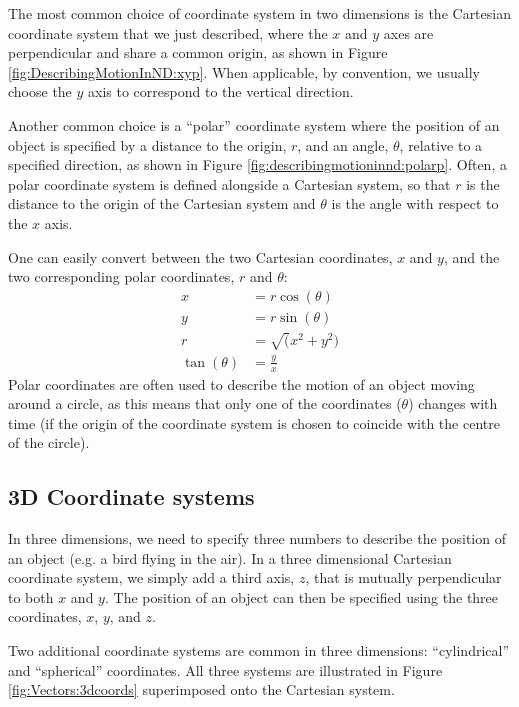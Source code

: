 The most common choice of coordinate system in two dimensions is the Cartesian coordinate system that we just described, where the $x$ and $y$ axes are perpendicular and share a common origin, as shown in Figure \ref{fig:DescribingMotionInND:xyp}. When applicable, by convention, we usually choose the $y$ axis to correspond to the vertical direction.

Another common choice is a ``polar'' coordinate system where the position of an object is specified by a distance to the origin, $r$, and an angle, $\theta$, relative to a specified direction, as shown in Figure \ref{fig:describingmotioninnd:polarp}. Often, a polar coordinate system is defined alongside a Cartesian system, so that $r$ is the distance to the origin of the Cartesian system and $\theta$ is the angle with respect to the $x$ axis.

One can easily convert between the two Cartesian coordinates, $x$ and $y$, and the two corresponding polar coordinates, $r$ and $\theta$:
\begin{align*}
x&=r\cos(\theta)\\
y&=r\sin(\theta)\\
r&=\sqrt(x^2+y^2)\\
\tan(\theta) &= \frac{y}{x}
\end{align*}
Polar coordinates are often used to describe the motion of an object moving around a circle, as this means that only one of the coordinates ($\theta$) changes with time (if the origin of the coordinate system is chosen to coincide with the centre of the circle).

\subsection{3D Coordinate systems}
In three dimensions, we need to specify three numbers to describe the position of an object (e.g. a bird flying in the air). In a three dimensional Cartesian coordinate system, we simply add a third axis, $z$, that is mutually perpendicular to both $x$ and $y$. The position of an object can then be specified using the three coordinates, $x$, $y$, and $z$. 

Two additional coordinate systems are common in three dimensions: ``cylindrical'' and ``spherical'' coordinates. All three systems are illustrated in Figure \ref{fig:Vectors:3dcoords} superimposed onto the Cartesian system.

